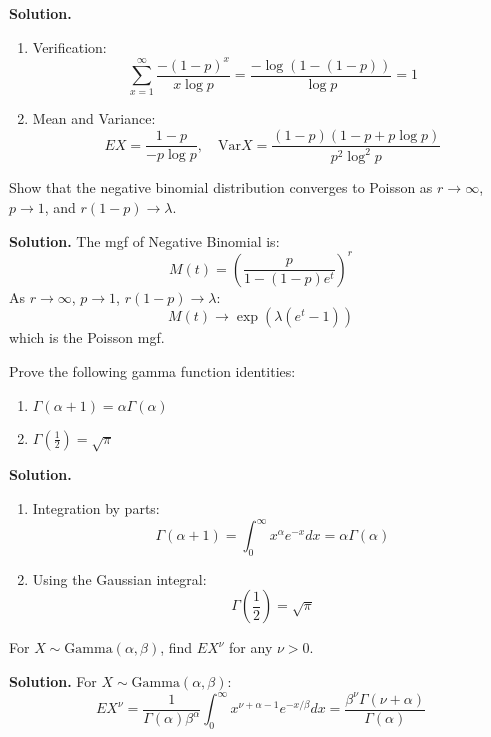 \noindent\textbf{Solution.}
\begin{enumerate}[label=(\alph*)]
\item Verification:
\[
\sum_{x=1}^\infty \frac{-(1-p)^x}{x\log p} = \frac{-\log(1-(1-p))}{\log p} = 1
\]

\item Mean and Variance:
\[
EX = \frac{1-p}{-p\log p}, \quad \text{Var}X = \frac{(1-p)(1-p+p\log p)}{p^2\log^2 p}
\]
\end{enumerate}

\begin{problembox}
Show that the negative binomial distribution converges to Poisson as \( r \to \infty \), \( p \to 1 \), and \( r(1-p) \to \lambda \).
\end{problembox}

\noindent\textbf{Solution.}
The mgf of Negative Binomial is:
\[
M(t) = \left(\frac{p}{1-(1-p)e^t}\right)^r
\]
As \( r \to \infty \), \( p \to 1 \), \( r(1-p) \to \lambda \):
\[
M(t) \to \exp\left(\lambda(e^t-1)\right)
\]
which is the Poisson mgf.

\begin{problembox}
Prove the following gamma function identities:
\begin{enumerate}[label=(\alph*)]
\item \( \Gamma(\alpha+1) = \alpha\Gamma(\alpha) \)
\item \( \Gamma\left(\frac{1}{2}\right) = \sqrt{\pi} \)
\end{enumerate}
\end{problembox}

\noindent\textbf{Solution.}
\begin{enumerate}[label=(\alph*)]
\item Integration by parts:
\[
\Gamma(\alpha+1) = \int_0^\infty x^\alpha e^{-x}dx = \alpha\Gamma(\alpha)
\]

\item Using the Gaussian integral:
\[
\Gamma\left(\frac{1}{2}\right) = \sqrt{\pi}
\]
\end{enumerate}

\begin{problembox}
For \( X \sim \text{Gamma}(\alpha,\beta) \), find \( EX^\nu \) for any \( \nu > 0 \).
\end{problembox}

\noindent\textbf{Solution.}
For \( X \sim \text{Gamma}(\alpha,\beta) \):
\[
EX^\nu = \frac{1}{\Gamma(\alpha)\beta^\alpha} \int_0^\infty x^{\nu+\alpha-1}e^{-x/\beta}dx = \frac{\beta^\nu\Gamma(\nu+\alpha)}{\Gamma(\alpha)}
\]


